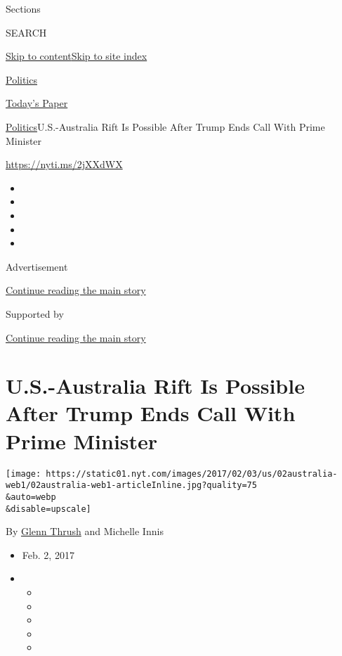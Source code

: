 Sections

SEARCH

\protect\hyperlink{site-content}{Skip to
content}\protect\hyperlink{site-index}{Skip to site index}

\href{https://www.nytimes.com/section/politics}{Politics}

\href{https://myaccount.nytimes.com/auth/login?response_type=cookie\&client_id=vi}{}

\href{https://www.nytimes.com/section/todayspaper}{Today's Paper}

\href{/section/politics}{Politics}\textbar{}U.S.-Australia Rift Is
Possible After Trump Ends Call With Prime Minister

\url{https://nyti.ms/2jXXdWX}

\begin{itemize}
\item
\item
\item
\item
\item
\end{itemize}

Advertisement

\protect\hyperlink{after-top}{Continue reading the main story}

Supported by

\protect\hyperlink{after-sponsor}{Continue reading the main story}

\hypertarget{us-australia-rift-is-possible-after-trump-ends-call-with-prime-minister}{%
\section{U.S.-Australia Rift Is Possible After Trump Ends Call With
Prime
Minister}\label{us-australia-rift-is-possible-after-trump-ends-call-with-prime-minister}}

\texttt{[image: https://static01.nyt.com/images/2017/02/03/us/02australia-web1/02australia-web1-articleInline.jpg?quality=75\\\&auto=webp\\\&disable=upscale]}

By \href{https://www.nytimes.com/by/glenn-thrush}{Glenn Thrush} and
Michelle Innis

\begin{itemize}
\item
  Feb. 2, 2017
\item
  \begin{itemize}
  \item
  \item
  \item
  \item
  \item
  \end{itemize}
\end{itemize}

